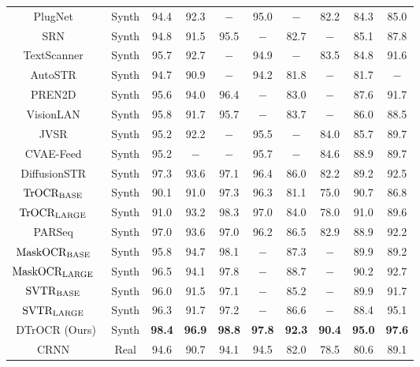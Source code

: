\documentclass[10pt,twocolumn,letterpaper]{article}
\begin{document}
\begin{table*}[tb]
\begin{tabular}{cccccccccc}
PlugNet~\cite{mou2020plugnet} & Synth &94.4 & 92.3 & $-$ & 95.0 & $-$ & 82.2 & 84.3 & 85.0 \\ 
SRN~\cite{yu2020srn} & Synth &94.8 & 91.5 & 95.5 & $-$ & 82.7 & $-$ & 85.1 & 87.8 \\ 
TextScanner~\cite{wan2020textscanner} & Synth &95.7 & 92.7 & $-$ & 94.9 & $-$ & 83.5 & 84.8 & 91.6 \\ 
AutoSTR~\cite{zhang2020autostr} & Synth &94.7 & 90.9 & $-$ & 94.2 & 81.8 & $-$ & 81.7 & $-$ \\ 
PREN2D~\cite{yan2021pren2d} & Synth &95.6 & 94.0 & 96.4 & $-$ & 83.0 & $-$ & 87.6 & 91.7 \\ 
VisionLAN~\cite{wang2021visionlan} & Synth &95.8 & 91.7 & 95.7 & $-$ & 83.7 & $-$ & 86.0 & 88.5 \\ 
JVSR~\cite{bhunia2021joint} & Synth &95.2 & 92.2 & $-$ & 95.5 & $-$ & 84.0 & 85.7 & 89.7 \\ 
CVAE-Feed~\cite{bhunia2021towards} &Synth & 95.2 & $-$ & $-$ & 95.7 & $-$ & 84.6 & 88.9 & 89.7 \\
DiffusionSTR~\cite{fujitake2023diffusionstr} & Synth & 97.3 & 93.6 & 97.1 & 96.4 & 86.0 & 82.2 & 89.2 & 92.5 \\

$\textrm{TrOCR}_{\rm BASE}$~\cite{li2021trocr} & Synth & 90.1 & 91.0 & 97.3 & 96.3 & 81.1 & 75.0 & 90.7 & 86.8  \\
$\textrm{TrOCR}_{\rm LARGE}$~\cite{li2021trocr} & Synth & 91.0 & 93.2 & 98.3 & 97.0 & 84.0 & 78.0 & 91.0 & 89.6  \\

PARSeq~\cite{bautista2022parseq} & Synth& 97.0 & 93.6 & 97.0 & 96.2 & 86.5 & 82.9 & 88.9 & 92.2 \\
$\textrm{MaskOCR}_{\rm BASE}$~\cite{lyu2022maskocr} & Synth & 95.8 & 94.7 & 98.1 & $-$ & 87.3 & $-$ & 89.9 & 89.2 \\
$\textrm{MaskOCR}_{\rm LARGE}$~\cite{lyu2022maskocr} & Synth& 96.5 & 94.1 & 97.8 & $-$ & 88.7 & $-$ & 90.2 & 92.7 \\

$\textrm{SVTR}_{\rm BASE}$~\cite{du2022svtr} & Synth & 96.0 & 91.5 & 97.1 & $-$ & 85.2 & $-$ & 89.9 & 91.7  \\
$\textrm{SVTR}_{\rm LARGE}$~\cite{du2022svtr} & Synth & 96.3 & 91.7 & 97.2 & $-$ & 86.6 & $-$ & 88.4 & 95.1  \\


DTrOCR (Ours) & Synth & \textbf{98.4} & \textbf{96.9} & \textbf{98.8} & \textbf{97.8} & \textbf{92.3} & \textbf{90.4} & \textbf{95.0} & \textbf{97.6} \\
\hline
\hline
CRNN~\cite{shi2016crnn, bautista2022parseq} & Real &94.6 & 90.7 & 94.1 & 94.5 & 82.0 & 78.5 & 80.6 & 89.1 \\ 


\end{tabular}
\end{table*}
\end{document}
